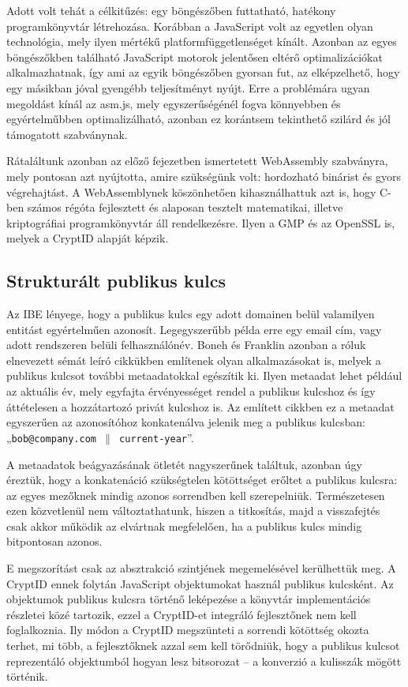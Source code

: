 Adott volt tehát a célkitűzés: egy böngészőben futtatható, hatékony programkönyvtár létrehozása. Korábban a JavaScript volt az egyetlen olyan technológia, mely ilyen mértékű platformfüggetlenséget kínált. Azonban az egyes böngészőkben található JavaScript motorok jelentősen eltérő optimalizációkat alkalmazhatnak, így ami az egyik böngészőben gyorsan fut, az elképzelhető, hogy egy másikban jóval gyengébb teljesítményt nyújt. Erre a problémára ugyan megoldást kínál az asm.js, mely egyszerűségénél fogva könnyebben és egyértelműbben optimalizálható, azonban ez korántsem tekinthető szilárd és jól támogatott szabványnak.

Rátaláltunk azonban az előző fejezetben ismertetett WebAssembly szabványra, mely pontosan azt nyújtotta, amire szükségünk volt: hordozható binárist és gyors végrehajtást. A WebAssemblynek köszönhetően kihasználhattuk azt is, hogy C-ben számos régóta fejlesztett és alaposan tesztelt matematikai, illetve kriptográfiai programkönyvtár áll rendelkezésre. Ilyen a GMP \cite{GMP} és az OpenSSL \cite{OpenSSL} is, melyek a CryptID alapját képzik.

\subsection{Strukturált publikus kulcs}

Az IBE lényege, hogy a publikus kulcs egy adott domainen belül valamilyen entitást egyértelműen azonosít. Legegyszerűbb példa erre egy email cím, vagy adott rendszeren belüli felhasználónév. Boneh és Franklin azonban a róluk elnevezett sémát leíró cikkükben \citeyear{Boneh::IdentityBasedEncryptionFromTheWeilPairing} említenek olyan alkalmazásokat is, melyek a publikus kulcsot további metaadatokkal egészítik ki. Ilyen metaadat lehet például az aktuális év, mely egyfajta érvényességet rendel a publikus kulcshoz és így áttételesen a hozzátartozó privát kulcshoz is. Az említett cikkben ez a metaadat egyszerűen az azonosítóhoz konkatenálva jelenik meg a publikus kulcsban: „\texttt{bob@company.com $\parallel$ current-year}”.

A metaadatok beágyazásának ötletét nagyszerűnek találtuk, azonban úgy éreztük, hogy a konkatenáció szükségtelen kötöttséget erőltet a publikus kulcsra: az egyes mezőknek mindig azonos sorrendben kell szerepelniük. Természetesen ezen közvetlenül nem változtathatunk, hiszen a titkosítás, majd a visszafejtés csak akkor működik az elvártnak megfelelően, ha a publikus kulcs mindig bitpontosan azonos.

E megszorítást csak az absztrakció szintjének megemelésével kerülhettük meg. A \mbox{CryptID} ennek folytán JavaScript objektumokat használ publikus kulcsként. Az objektumok publikus kulcsra történő leképezése a könyvtár implementációs részletei közé tartozik, ezzel a CryptID-et integráló fejlesztőnek nem kell foglalkoznia. Ily módon a CryptID megszünteti a sorrendi kötöttség okozta terhet, mi több, a fejlesztőknek azzal sem kell törődniük, hogy a publikus kulcsot reprezentáló objektumból hogyan lesz bitsorozat – a konverzió a kulisszák mögött történik.

